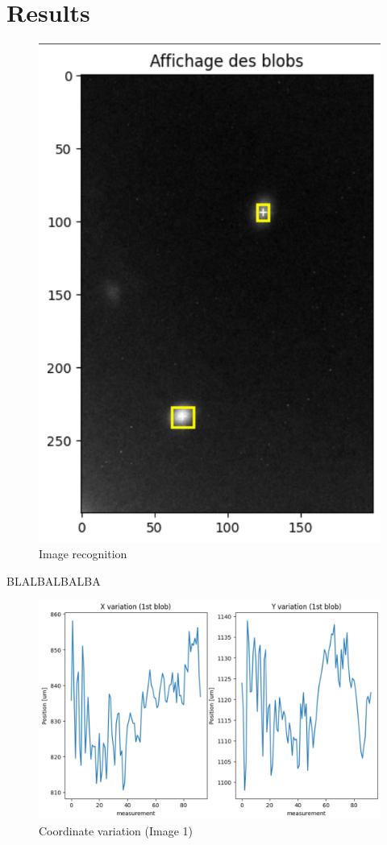 \section{Results}
\begin{figure}[H]
    \centering
    \includegraphics[scale=0.85]{assets/figures/MesuresResultats/BlobsInit.png}
    \caption{Image recognition}
    \label{fig:MES_ImaBlob}
\end{figure}
BLALBALBALBA
\begin{figure}[H]
    \centering
    \includegraphics[scale=0.65]{assets/figures/MesuresResultats/VariationImage1.png}
    \caption{Coordinate variation (Image 1)}
    \label{fig:MES_VarIm1}
\end{figure}
